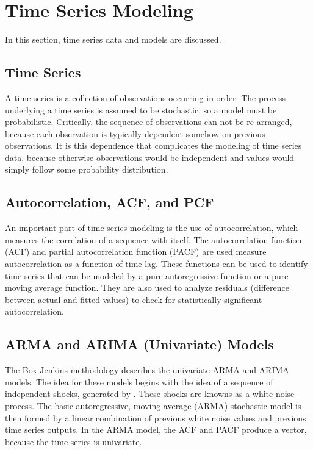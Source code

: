 \documentclass[a4paper]{scrartcl}
\begin{document}
\section*{Time Series Modeling}
\label{sec:time_series_modeling}
In this section, time series data and models are discussed.

\subsection*{Time Series}
A time series is a collection of observations occurring in order. The process underlying a time series is assumed to be stochastic, so a model must be probabilistic. Critically, the sequence of observations can not be re-arranged, because each observation is typically dependent somehow on previous observations. It is this dependence that complicates the modeling of time series data, because otherwise observations would be independent and values would simply follow some probability distribution. 

\subsection*{Autocorrelation, ACF, and PCF}
An important part of time series modeling is the use of autocorrelation, which measures the correlation of a sequence with itself. The autocorrelation function (ACF) and partial autocorrelation function (PACF) are used measure autocorrelation as a function of time lag. These functions can be used to identify time series that can be modeled by a pure autoregressive function or a pure moving average function. They are also used to analyze residuals (difference between actual and fitted values) to check for statistically significant autocorrelation. 

\subsection*{ARMA and ARIMA (Univariate) Models}
The Box-Jenkins methodology describes the univariate ARMA and ARIMA models. The idea for these models begins with the idea of a sequence of independent shocks, generated by \cite{box_jenkins_reinsel_2008}. These shocks are knowns as a white noise process. The basic autoregressive, moving average (ARMA) stochastic model is then formed by a linear combination of previous white noise values and previous time series outputs. In the ARMA model, the ACF and PACF produce a vector, because the time series is univariate.
\end{document}
